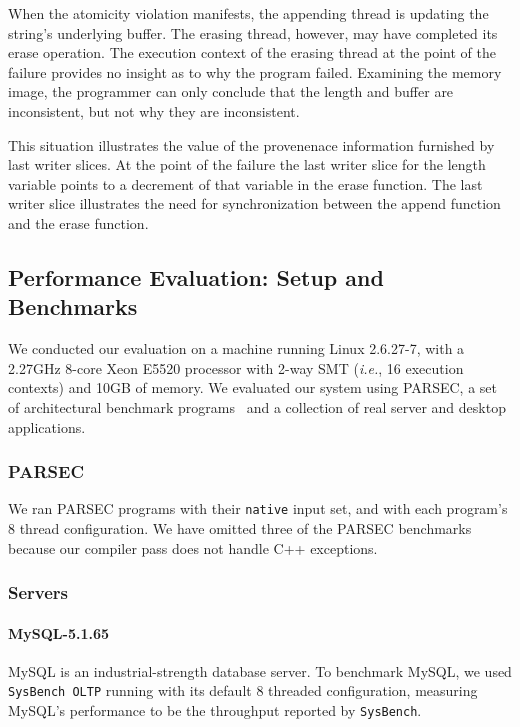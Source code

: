 \documentclass[preprint,9pt]{sigplanconf}
\begin{document}
When the atomicity violation manifests, the appending thread is updating the
string's underlying buffer.  The erasing thread, however, may have completed
its erase operation.  The execution context of the erasing thread at the point
of the failure provides no insight as to why the program failed.  Examining the memory image, the programmer can only conclude that the length and buffer are 
inconsistent, but not why they are inconsistent.

This situation illustrates the value of the provenenace information furnished
by last writer slices.  At the point of the failure the last writer slice for
the length variable points to a decrement of that variable in the erase
function.  The last writer slice illustrates the need for synchronization
between the append function and the erase function.  


\subsection{Performance Evaluation: Setup and Benchmarks}

We conducted our evaluation on a machine running Linux 2.6.27-7, with a 2.27GHz
8-core Xeon E5520 processor with 2-way SMT ({\em i.e.}, 16 execution contexts)
and 10GB of memory.  We evaluated our system using PARSEC, a set of
architectural benchmark programs~\cite{parsec} and a collection of real server
and desktop applications.    

\subsubsection{PARSEC}

We ran PARSEC programs with their {\tt native} input set, and with each
program's 8 thread configuration. We have omitted three of the PARSEC
benchmarks because our compiler pass does not handle C++ exceptions.    

\subsubsection{Servers}


\paragraph{MySQL-5.1.65} MySQL is an industrial-strength database
server. To benchmark MySQL, we used {\tt SysBench OLTP} running with its
default 8 threaded configuration, measuring MySQL's performance to be the
throughput reported by {\tt SysBench}.  
\end{document}
